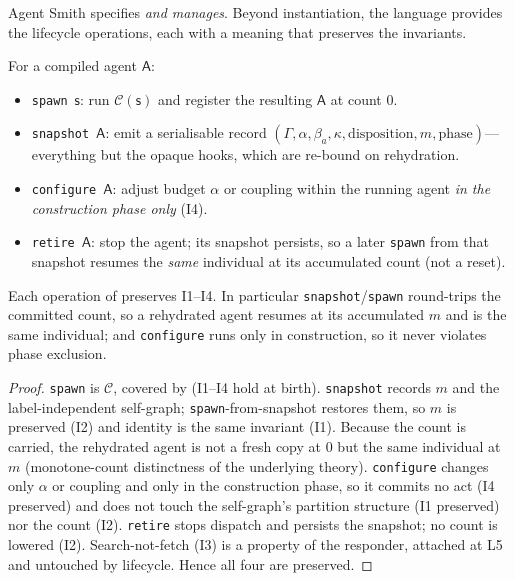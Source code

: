 \documentclass[11pt,twocolumn,a4paper]{article}
\newcommand{\Agent}{\mathsf{A}}
\newcommand{\Self}{\Gamma}
\newcommand{\floorc}{\beta}
\newcommand{\att}{\alpha}
\newcommand{\spec}{\mathsf{s}}         %
\newcommand{\compile}{\mathcal{C}}     %
\newcommand{\coh}{\kappa}              %
\begin{document}
Agent Smith specifies \emph{and manages}. Beyond instantiation, the language
provides the lifecycle operations, each with a meaning that preserves the
invariants.

\begin{definition}
\label{def:lifecycle}
For a compiled agent $\Agent$:
\begin{itemize}[leftmargin=*]
\item \texttt{spawn}\ $\spec$: run $\compile(\spec)$ and register the resulting
$\Agent$ at count $0$.
\item \texttt{snapshot}\ $\Agent$: emit a serialisable record
$(\Self,\att,\floorc_a,\coh,\text{disposition},m,\text{phase})$---everything
but the opaque hooks, which are re-bound on rehydration.
\item \texttt{configure}\ $\Agent$: adjust budget $\att$ or coupling within the
running agent \emph{in the construction phase only} (I4).
\item \texttt{retire}\ $\Agent$: stop the agent; its snapshot persists, so a
later \texttt{spawn} from that snapshot resumes the \emph{same} individual at
its accumulated count (not a reset).
\end{itemize}
\end{definition}

\begin{theorem}
\label{thm:lifecycle}
Each operation of  preserves I1--I4. In particular
\texttt{snapshot}/\texttt{spawn} round-trips the committed count, so a
rehydrated agent resumes at its accumulated $m$ and is the same individual;
and \texttt{configure} runs only in construction, so it never violates phase
exclusion.
\end{theorem}

\begin{proof}
\texttt{spawn} is $\compile$, covered by  (I1--I4 hold
at birth). \texttt{snapshot} records $m$ and the label-independent self-graph;
\texttt{spawn}-from-snapshot restores them, so $m$ is preserved (I2) and
identity is the same invariant (I1). Because the count is carried, the
rehydrated agent is not a fresh copy at $0$ but the same individual at $m$
(monotone-count distinctness of the underlying theory). \texttt{configure}
changes only $\att$ or coupling and only in the construction phase, so it
commits no act (I4 preserved) and does not touch the self-graph's partition
structure (I1 preserved) nor the count (I2). \texttt{retire} stops dispatch
and persists the snapshot; no count is lowered (I2). Search-not-fetch (I3) is a
property of the responder, attached at L5 and untouched by lifecycle. Hence all
four are preserved.
\end{proof}
\end{document}
